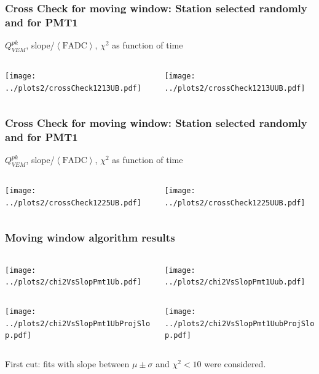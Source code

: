 \documentclass[aspectratio=169]{beamer}
\begin{document}
\begin{frame}
  \frametitle{Cross Check for moving window: Station selected
  randomly and for PMT1}
  $Q^{pk}_{VEM}$, slope/$\left<\mathrm{FADC}\right>$, $\chi^2$ as
  function of time
  \vspace{0.5cm}
  \begin{columns}
    \begin{column}{0.5\textwidth}
      \texttt{[image: ../plots2/crossCheck1213UB.pdf]}
    \end{column}
    \begin{column}{0.5\textwidth}
      \texttt{[image: ../plots2/crossCheck1213UUB.pdf]}
    \end{column}
  \end{columns}
\end{frame}

\begin{frame}
  \frametitle{Cross Check for moving window: Station selected
  randomly and for PMT1}
  $Q^{pk}_{VEM}$, slope/$\left<\mathrm{FADC}\right>$, $\chi^2$ as
  function of time
  \vspace{0.5cm}
  \begin{columns}
    \begin{column}{0.5\textwidth}
      \texttt{[image: ../plots2/crossCheck1225UB.pdf]}
    \end{column}
    \begin{column}{0.5\textwidth}
      \texttt{[image: ../plots2/crossCheck1225UUB.pdf]}
    \end{column}
  \end{columns}
\end{frame}

\begin{frame}
  \frametitle{Moving window algorithm results}
  \vspace{0.5cm}
  \begin{columns}
    \begin{column}{0.5\textwidth}
      \texttt{[image: ../plots2/chi2VsSlopPmt1Ub.pdf]}
    \end{column}
    \begin{column}{0.5\textwidth}
      \texttt{[image: ../plots2/chi2VsSlopPmt1Uub.pdf]}
    \end{column}
  \end{columns}
  \begin{columns}
    \begin{column}{0.5\textwidth}
      \texttt{[image: ../plots2/chi2VsSlopPmt1UbProjSlop.pdf]}
    \end{column}
    \begin{column}{0.5\textwidth}
      \texttt{[image: ../plots2/chi2VsSlopPmt1UubProjSlop.pdf]}
    \end{column}
  \end{columns}
  {\footnotesize 
    First cut: fits with slope between $\mu\pm\sigma$ and
    $\chi^2<10$ were considered.
  }
\end{frame}
\end{document}
